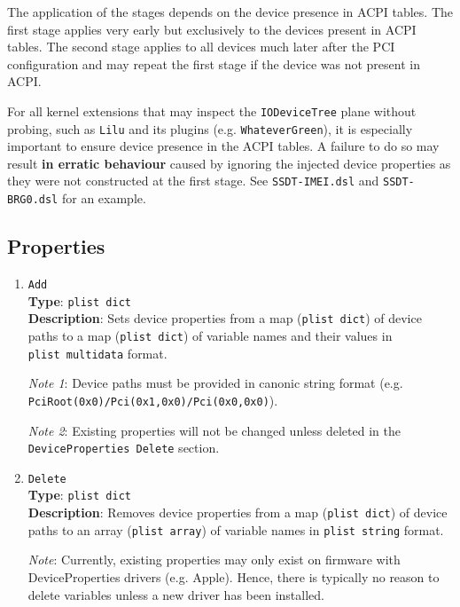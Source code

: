 \documentclass[]{article}
\begin{document}
The application of the stages depends on the device presence in ACPI tables.
The first stage applies very early but exclusively to the devices present in ACPI tables.
The second stage applies to all devices much later after the PCI configuration
and may repeat the first stage if the device was not present in ACPI.

For all kernel extensions that may inspect the \texttt{IODeviceTree} plane without probing,
such as \texttt{Lilu} and its plugins (e.g. \texttt{WhateverGreen}), it is especially
important to ensure device presence in the ACPI tables. A failure to do so may result
\textbf{in erratic behaviour} caused by ignoring the injected device properties
as they were not constructed at the first stage. See \texttt{SSDT-IMEI.dsl} and
\texttt{SSDT-BRG0.dsl} for an example.

\subsection{Properties}\label{devpropsprops}

\begin{enumerate}
\item
  \texttt{Add}\\
  \textbf{Type}: \texttt{plist\ dict}\\
  \textbf{Description}: Sets device properties from a map (\texttt{plist\ dict})
  of device paths to a map (\texttt{plist\ dict}) of variable names and their values
  in \texttt{plist\ multidata} format.

  \emph{Note 1}: Device paths must be provided in canonic string format
  (e.g. \texttt{PciRoot(0x0)/Pci(0x1,0x0)/Pci(0x0,0x0)}).

  \emph{Note 2}: Existing properties will not be changed unless deleted
  in the \texttt{DeviceProperties\ Delete} section.

\item
  \texttt{Delete}\\
  \textbf{Type}: \texttt{plist\ dict}\\
  \textbf{Description}: Removes device properties from a map (\texttt{plist\ dict})
  of device paths to an array (\texttt{plist\ array}) of variable names in
  \texttt{plist\ string} format.

  \emph{Note}: Currently, existing properties may only exist on firmware
  with DeviceProperties drivers (e.g. Apple). Hence, there is typically
  no reason to delete variables unless a new driver has been installed.

\end{enumerate}
\end{document}
